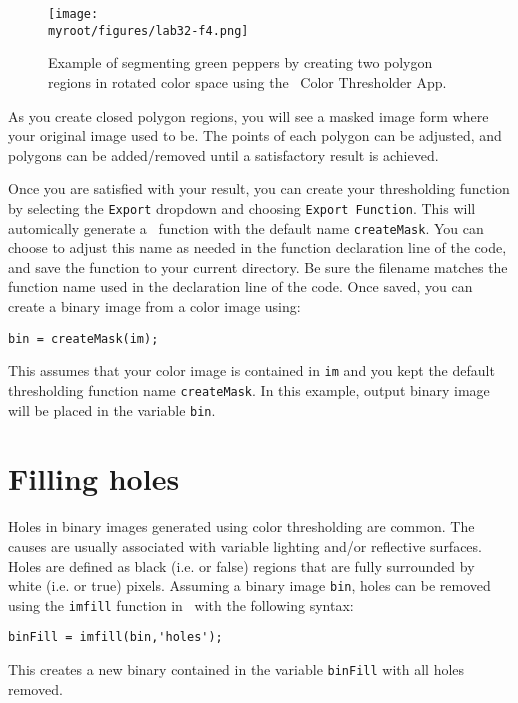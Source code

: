 \documentclass{tufte-handout}
\newcommand{\myroot}{../..}
\begin{document}
\begin{figure}
\begin{center}
\texttt{[image: \\myroot/figures/lab32-f4.png]}
\end{center}
\caption{Example of segmenting green peppers by creating two polygon regions in rotated color space using the \Matlab\ Color Thresholder App.}
\label{fig:4}
\end{figure}
As you create closed polygon regions, you will see a masked image form where your original image used to be. The points of each polygon can be adjusted, and polygons can be added/removed until a satisfactory result is achieved. 

Once you are satisfied with your result, you can create your thresholding function by selecting the \lstinline{Export} dropdown and choosing \lstinline{Export Function}. This will automically generate a \Matlab\ function with the default name \lstinline{createMask}. You can choose to adjust this name as needed in the function declaration line of the code, and save the function to your current directory. Be sure the filename matches the function name used in the declaration line of the code. Once saved, you can create a binary image from a color image using:
\begin{lstlisting}[style=usnaMatlab]
bin = createMask(im);
\end{lstlisting}
This assumes that your color image is contained in \lstinline{im} and you kept the default thresholding function name \lstinline{createMask}. In this example, output binary image will be placed in the variable \lstinline{bin}.

\section{Filling holes}
Holes in binary images generated using color thresholding are common. The causes are usually associated with variable lighting and/or reflective surfaces. Holes are defined as black (i.e.  or false) regions that are fully surrounded by white (i.e.  or true) pixels. Assuming a binary image \lstinline{bin}, holes can be removed using the \lstinline{imfill} function in \Matlab\ with the following syntax:
\begin{lstlisting}[style=usnaMatlab]
binFill = imfill(bin,'holes');
\end{lstlisting}
This creates a new binary contained in the variable \lstinline{binFill} with all holes removed.
\end{document}
